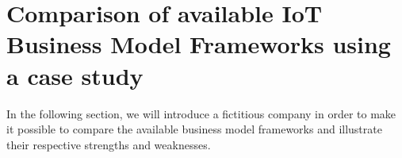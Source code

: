 
\section{Comparison of available IoT Business Model Frameworks using a case study}
	In the following section, we will introduce a fictitious company in order to make it possible to compare the available business model frameworks and illustrate their respective strengths and weaknesses.

